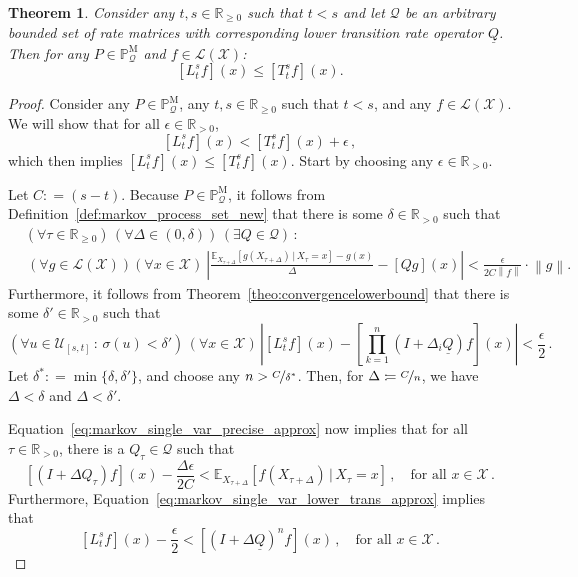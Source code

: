 \documentclass[10pt]{paper}
\newtheorem{theorem}{Theorem}
\newcommand{\reals}{\mathbb{R}}
\newcommand{\realspos}{\reals_{>0}}
\newcommand{\realsnonneg}{\reals_{\geq 0}}
\newcommand{\states}{\mathcal{X}}
\newcommand{\processes}{\mathbb{P}}
\newcommand{\mprocesses}{\processes^{\mathrm{M}}}
\newcommand{\lbound}{L}
\newcommand{\gambles}{\mathcal{L}}
\newcommand{\gamblesX}{\gambles(\states)}
\newcommand{\rateset}{\mathcal{Q}}
\newcommand{\lrate}{\underline{Q}}
\newcommand{\norm}[1]{\left\lVert #1 \right\rVert}
\newcommand{\coloneqq}{:\!=}
\begin{document}
\begin{theorem}\label{theorem:markov_single_var_lower_bounded_new}
Consider any $t,s\in\realsnonneg$ such that $t<s$ and let $\rateset$ be an arbitrary bounded set of rate matrices with corresponding lower transition rate operator $\lrate$. Then for any $P\in\mprocesses_\rateset$ and $f\in\gamblesX$:
\begin{equation*}
\left[\lbound_t^sf\right](x)\leq \left[T_t^sf\right](x).
\end{equation*}
\end{theorem}
\begin{proof}
Consider any $P\in\mprocesses_\rateset$, any $t,s\in\realsnonneg$ such that $t<s$, and any $f\in\gamblesX$. We will show that for all $\epsilon\in\realspos$,
\begin{equation*}
\left[L_t^sf\right](x) < \left[T_t^sf\right](x)+\epsilon\,,
\end{equation*}
which then implies $\left[\lbound_t^sf\right](x)\leq \left[T_t^sf\right](x)$. Start by choosing any $\epsilon\in\realspos$.

Let $C\coloneqq (s-t)$. Because $P\in\mprocesses_\rateset$, it follows from Definition~\ref{def:markov_process_set_new} that there is some $\delta\in\realspos$ such that
\begin{align}
&(\forall \tau\in\realsnonneg)\,
(\forall\Delta\in(0,\delta))\,
(\exists Q\in\rateset)\,:\\
 &\,(\forall g\in\gamblesX)(\forall x\in\states)~
\left\lvert\frac{\mathbb{E}_{X_{\tau+\Delta}}[g(X_{\tau+\Delta})\,\vert\,X_\tau=x]-g(x)}{\Delta}-\left[Qg\right](x)\right\rvert<\frac{\epsilon}{2C\norm{f}}\cdot\norm{g}.\label{eq:markov_single_var_precise_approx}
\end{align}
Furthermore, it follows from Theorem~\ref{theo:convergencelowerbound} that there is some $\delta'\in\realspos$ such that
\begin{equation}\label{eq:markov_single_var_lower_trans_approx}
(\forall u\in\mathcal{U}_{[s,t]}\,:\,\sigma(u)<\delta')\,(\forall x\in\states)\,\left\lvert \left[L_t^sf\right](x) - \left[\prod_{k=1}^n(I+\Delta_i\lrate)f\right](x)\right\rvert < \frac{\epsilon}{2}\,.
\end{equation}
Let $\delta^*\coloneqq\min\{\delta,\delta'\}$, and choose any $n>\nicefrac{C}{\delta^*}$. Then, for $\Delta\coloneqq\nicefrac{C}{n}$, we have $\Delta<\delta$ and $\Delta<\delta'$.

Equation~\eqref{eq:markov_single_var_precise_approx} now implies that for all $\tau\in\realspos$, there is a $Q_\tau\in\rateset$ such that
\begin{equation}\label{eq:markov_single_var_precise_bound}
\left[(I + \Delta Q_\tau)f\right](x) - \frac{\Delta\epsilon}{2C} < \mathbb{E}_{X_{\tau+\Delta}}[f(X_{\tau+\Delta})\,\vert\,X_\tau=x]\,,\quad\text{for all $x\in\states$}\,.
\end{equation}
Furthermore, Equation~\eqref{eq:markov_single_var_lower_trans_approx} implies that
\begin{equation}\label{eq:markov_single_var_lower_bound}
\left[L_t^sf\right](x) - \frac{\epsilon}{2} < \left[(I+\Delta\lrate)^nf\right](x)\,,\quad\text{for all $x\in\states$}\,.
\end{equation}


\end{proof}
\end{document}
